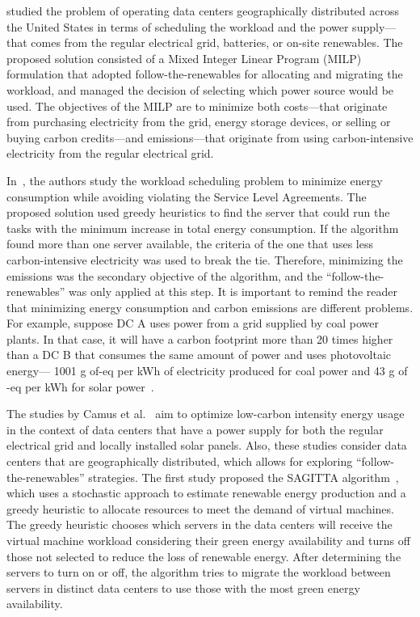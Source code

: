 \citet{RUIZDUARTE2023_operation_dcs_renewables} studied the problem of operating data centers geographically distributed across the United States in terms of scheduling the workload and the power supply---that comes from the regular electrical grid, batteries, or on-site renewables. The proposed solution consisted of a Mixed Integer Linear Program (MILP) formulation that adopted follow-the-renewables for allocating and migrating the workload, and managed the decision of selecting which power source would be used. The objectives of the MILP are to minimize both costs---that originate from purchasing electricity from the grid, energy storage devices, or selling or buying carbon credits---and  emissions---that originate from using carbon-intensive electricity from the regular electrical grid.

In~\citet{KHODAYARSERESHT2023_energycarbonaware_vm}, the authors study the workload scheduling problem to minimize energy consumption while avoiding violating the Service Level Agreements. The proposed solution used greedy heuristics to find the server that could run the tasks with the minimum increase in total energy consumption. If the algorithm found more than one server available, the criteria of the one that uses less carbon-intensive electricity was used to break the tie. Therefore, minimizing the emissions was the secondary objective of the algorithm, and the ``follow-the-renewables'' was only applied at this step. It is important to remind the reader that minimizing energy consumption and carbon emissions are different problems. For example, suppose DC A uses power from a grid supplied by coal power plants. In that case, it will have a carbon footprint more than 20 times higher than a DC B that consumes the same amount of power and uses photovoltaic energy--- 1001 g of-eq per kWh of electricity produced for coal power and 43  g of -eq per kWh for solar power~\cite{nrel_lifecycle_2021}. 

The studies by Camus et al.~\cite{SCORPIOUS,NEMESIS,SAGITTA} aim to optimize low-carbon intensity energy usage in the context of data centers that have a power supply for both the regular electrical grid and locally installed solar panels. Also, these studies consider data centers that are geographically distributed, which allows for exploring ``follow-the-renewables'' strategies. The first study proposed the SAGITTA algorithm~\citep{SAGITTA}, which uses a stochastic approach to estimate renewable energy production and a greedy heuristic to allocate resources to meet the demand of virtual machines. The greedy heuristic chooses which servers in the data centers will receive the virtual machine workload considering their green energy availability and turns off those not selected to reduce the loss of renewable energy. After determining the servers to turn on or off, the algorithm tries to migrate the workload between servers in distinct data centers to use those with the most green energy availability. 

